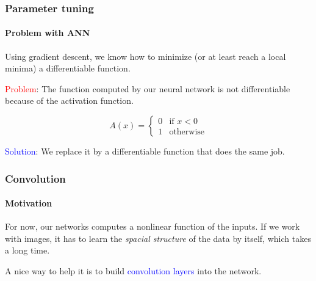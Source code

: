 \documentclass[9pt]{beamer}
\begin{document}
\begin{frame}

  \frametitle{Parameter tuning}

  \framesubtitle{Problem with ANN}

  Using gradient descent, we know how to minimize (or at least reach a
  local minima) a differentiable function.

  \pause
  \bigskip

  \textcolor{red}{Problem}: The function computed by our neural network is not
  differentiable because of the activation function.
  
  \[
  A(x) = \begin{cases}
    0 & \text{if } x < 0 \\
    1 & \text{otherwise}
  \end{cases}
  \]
  
  \medskip

  \pause

  \textcolor{blue}{Solution}: We replace it by a differentiable
  function that does the same job.

  \begin{center}
  \end{center}
\end{frame}

\begin{frame}
  \frametitle{Convolution}

  \framesubtitle{Motivation}

  For now, our networks computes a nonlinear function of the
  inputs. If we work with images, it has to learn the \emph{spacial
    structure} of the data by itself, which takes a long time.

  \bigskip 

  A nice way to help it is to build \textcolor{blue}{convolution
    layers} into the network.
\end{frame}
\end{document}
